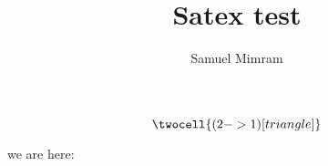 \documentclass[a4paper]{article}
\title{Satex test}
\author{Samuel Mimram}
\begin{document}
\maketitle

\[
  \twocell{(2->1)[triangle]}
\]









we are here:













\end{document}
